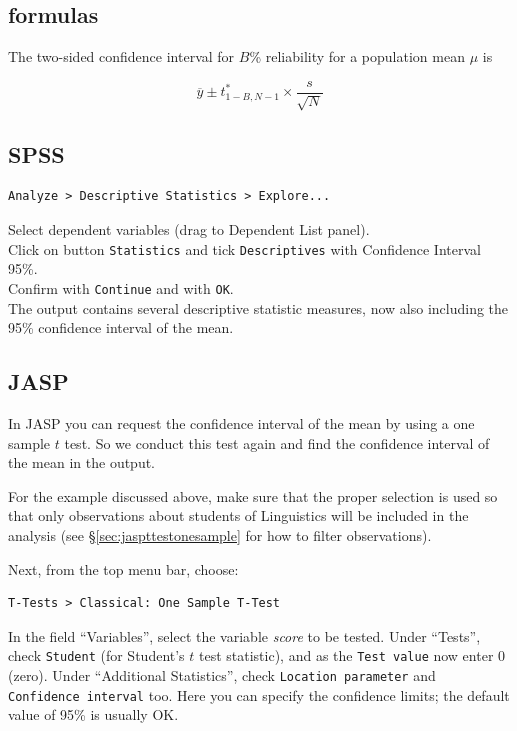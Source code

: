 \documentclass[
]{book}
\begin{document}
\subsection{formulas}\label{sec:formulas13-2}

The two-sided confidence interval for \(B\)\% reliability for a population mean \(\mu\) is

\begin{equation}
    \overline{y} \pm t^*_{1-B,N-1} \times \frac{s}{\sqrt{N}}
  \label{eq:t-onesampleCI}
\end{equation}

\subsection{SPSS}\label{spss-11}

\begin{verbatim}
Analyze > Descriptive Statistics > Explore...
\end{verbatim}

Select dependent variables (drag to Dependent List panel).\\
Click on button \texttt{Statistics} and tick \texttt{Descriptives} with Confidence Interval
95\%.\\
Confirm with \texttt{Continue} and with \texttt{OK}.\\
The output contains several descriptive statistic measures, now also
including the 95\% confidence interval of the mean.

\subsection{JASP}\label{jasp-11}

In JASP you can request the confidence interval of the mean by using a one sample \(t\) test.
So we conduct this test again and find the confidence interval of the mean in the output.

For the example discussed above, make sure that the proper selection is used so that only observations about students of Linguistics will be included in the analysis (see §\ref{sec:jaspttestonesample} for how to filter observations).

Next, from the top menu bar, choose:

\begin{verbatim}
T-Tests > Classical: One Sample T-Test
\end{verbatim}

In the field ``Variables'', select the variable \emph{score} to be tested.
Under ``Tests'', check \texttt{Student} (for Student's \(t\) test statistic), and as the \texttt{Test\ value} now enter \(0\) (zero).
Under ``Additional Statistics'', check \texttt{Location\ parameter} and \texttt{Confidence\ interval} too. Here you can specify the confidence limits; the default value of 95\% is usually OK.
\end{document}
